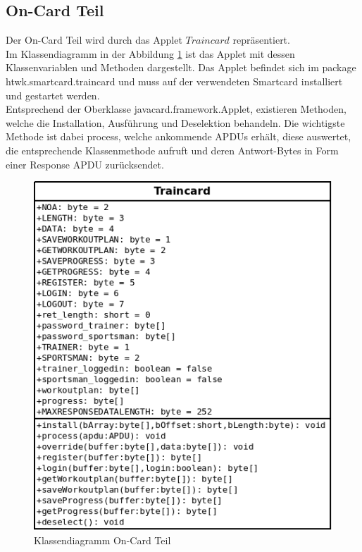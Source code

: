 \subsection{On-Card Teil}
\label{subsec:3.2}
Der On-Card Teil wird durch das Applet $Traincard$ repräsentiert.
\\


Im Klassendiagramm in der Abbildung \ref{diaoncard} ist das Applet mit dessen Klassenvariablen und Methoden dargestellt.
Das Applet befindet sich im package\\htwk.smartcard.traincard und muss auf der verwendeten Smartcard installiert und gestartet werden.
\\

Entsprechend der Oberklasse javacard.framework.Applet, existieren Methoden, welche die Installation, Ausführung und Deselektion behandeln.
Die wichtigste Methode ist dabei process, welche ankommende APDUs erhält, diese auswertet, die entsprechende Klassenmethode aufruft und deren Antwort-Bytes in Form einer Response APDU zurücksendet.

\begin{figure}[htb]
\begin{center}
 \includegraphics[width=.7\hsize]{./images/Klassendiagramm_oncard.png}
\end{center}
\caption[Klassendiagramm On-Card Teil]{\label{diaoncard}Klassendiagramm On-Card Teil}
\end{figure}



